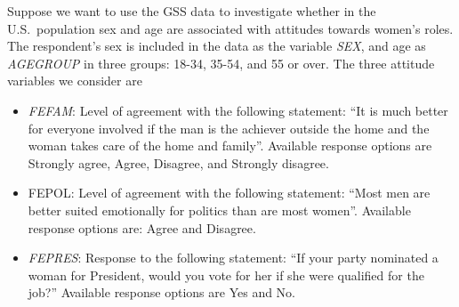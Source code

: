 Suppose we want to use the GSS data to investigate whether in the U.S.\ population
sex and age are associated with attitudes towards women's roles. The
respondent's sex is
included in the data as the variable \emph{SEX}, and age as
\emph{AGEGROUP} in three groups: 18-34, 35-54, and 55 or over.
The three attitude variables we consider are
\begin{itemize}
\item
\emph{FEFAM}: Level of agreement with the following statement: ``It is much better for
everyone involved if the man is the achiever outside the home and the woman takes care
of the home and family''. Available response options are
Strongly agree, Agree, Disagree, and Strongly disagree.
\item
FEPOL: Level of agreement with the following statement: ``Most men are better suited
emotionally for politics than are most women''. Available response options are:
Agree and
Disagree.
\item
\emph{FEPRES}: Response to the following statement: ``If your party nominated a woman
for President, would you vote for her if she were qualified for the job?''
Available response options are  Yes and No.
\end{itemize}

